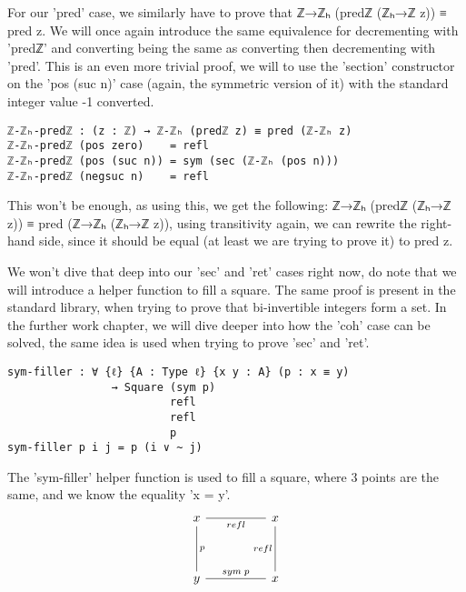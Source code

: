 For our 'pred' case, we similarly have to prove that ℤ→ℤₕ (predℤ (ℤₕ→ℤ z)) ≡ pred z. We will once again introduce the same equivalence for decrementing with 'predℤ' and converting being the same as converting then decrementing with 'pred'. This is an even more trivial proof, we will to use the 'section' constructor on the 'pos (suc n)' case (again, the symmetric version of it) with the standard integer value -1 converted.
\begin{verbatim}
ℤ-ℤₕ-predℤ : (z : ℤ) → ℤ-ℤₕ (predℤ z) ≡ pred (ℤ-ℤₕ z)
ℤ-ℤₕ-predℤ (pos zero)    = refl
ℤ-ℤₕ-predℤ (pos (suc n)) = sym (sec (ℤ-ℤₕ (pos n)))
ℤ-ℤₕ-predℤ (negsuc n)    = refl
\end{verbatim}
This won't be enough, as using this, we get the following: ℤ→ℤₕ (predℤ (ℤₕ→ℤ z)) ≡ pred (ℤ→ℤₕ (ℤₕ→ℤ z)), using transitivity again, we can rewrite the right-hand side, since it should be equal (at least we are trying to prove it) to pred z.

We won't dive that deep into our 'sec' and 'ret' cases right now, do note that we will introduce a helper function to fill a square. The same proof is present in the standard library, when trying to prove that bi-invertible integers form a set. In the further work chapter, we will dive deeper into how the 'coh' case can be solved, the same idea is used when trying to prove 'sec' and 'ret'.

\begin{verbatim}
sym-filler : ∀ {ℓ} {A : Type ℓ} {x y : A} (p : x ≡ y)
                → Square (sym p)
                         refl
                         refl
                         p
sym-filler p i j = p (i ∨ ~ j)
\end{verbatim}

The 'sym-filler' helper function is used to fill a square, where 3 points are the same, and we know the equality 'x = y'.
\[\begin{tikzcd}
	x && x \\
	\\
	y && x
	\arrow["refl"', no head, from=1-1, to=1-3]
	\arrow["refl"', no head, from=1-3, to=3-3]
	\arrow["p"', no head, from=3-1, to=1-1]
	\arrow["{sym\;p}", no head, from=3-1, to=3-3]
\end{tikzcd}\]

